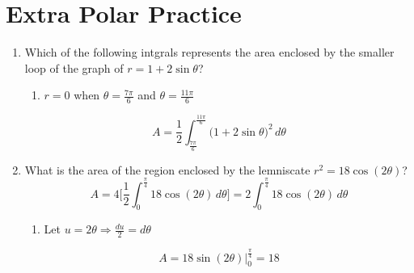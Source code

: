 \documentclass[12pt]{article}
\begin{document}
\section*{Extra Polar Practice}
\begin{enumerate}
	\item Which of the following intgrals represents the area enclosed by the smaller loop of the graph of $r=1+2\sin\theta$?
	      \begin{enumerate}
	      	\item $r=0$ when $\theta = \frac{7\pi}{6}$ and $\theta = \frac{11\pi}{6}$
	      \end{enumerate}
	      $$\boxed{A = \frac{1}{2} \int_{\frac{7\pi}{6}}^{\frac{11\pi}{6}} \big(1+2\sin\theta\big)^2\, d\theta}$$
	\item What is the area of the region enclosed by the lemniscate $r^2=18\cos(2\theta)$?
	      $$A = 4\biggr[\frac{1}{2} \int_{0}^{\frac{\pi}{4}}18 \cos(2\theta)\, d\theta \biggr] = 2\int_{0}^{\frac{\pi}{4}}18 \cos(2\theta)\, d\theta$$
	      \begin{enumerate}
	      	\item Let $u=2\theta \Longrightarrow \frac{du}{2} = d\theta$
	      \end{enumerate}
	      $$A = 18\sin(2\theta)\biggr\rvert_{0}^{\frac{\pi}{4}} = \boxed{18}$$
	      

\end{enumerate}
\end{document}
